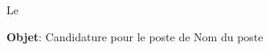 \documentclass[10pt, a4paper]{article}
\begin{document}
    \initdocument
    
    

    
    Le \todayFR

    \textbf{Objet}: Candidature pour le poste de Nom du poste

    
    
\end{document}
